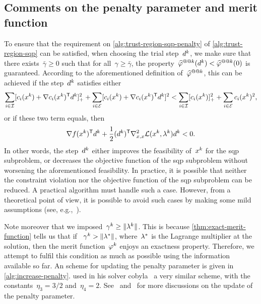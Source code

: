 \subsection{Comments on the penalty parameter and merit function}
\label{subsec:penalty-parameter-merit-function}

To ensure that the requirement on \cref{alg:trust-region-sqp-penalty} of \cref{alg:trust-region-sqp} can be satisfied, when choosing the trial step~$\step[k]$, we make sure that there exists~$\bar{\gamma} \ge 0$ such that for all~$\gamma \ge \bar{\gamma}$, the property~$\meritm[k](\step[k]) < \meritm[k](0)$ is guaranteed.
According to the aforementioned definition of~$\meritm[k]$, this can be achieved if the step~$\step[k]$ satisfies either
\begin{equation*}
    \sum_{i \in \iub} \posp{\con{i}(\iter[k]) + \nabla \con{i}(\iter[k])^{\T} \step[k]}^2 + \sum_{i \in \ieq} [\con{i}(\iter[k]) + \nabla \con{i}(\iter[k])^{\T} \step[k]]^2 < \sum_{i \in \iub} \posp{\con{i}(\iter[k])}^2 + \sum_{i \in \ieq} \con{i}(\iter[k])^2,
\end{equation*}
or if these two term equals, then
\begin{equation*}
    \nabla \obj(\iter[k])^{\T} \step[k] + \frac{1}{2} (\step[k])^{\T} \nabla_{x, x}^2 \lag(\iter[k], \lm[k]) \step[k] < 0.
\end{equation*}
In other words, the step~$\step[k]$ either improves the feasibility of~$\iter[k]$ for the \gls{sqp} subproblem, or decreases the objective function of the \gls{sqp} subproblem without worsening the aforementioned feasibility.
In practice, it is possible that neither the constraint violation nor the objective function of the \gls{sqp} subproblem can be reduced.
A practical algorithm must handle such a case.
However, from a theoretical point of view, it is possible to avoid such cases by making some mild assumptions (see, e.g.,~\cite[Asm.~3.1]{Powell_Yuan_1991}).

Note moreover that we imposed~$\gamma^k \ge \norm{\lm[k]}$.
This is because \cref{thm:exact-merit-function} tells us that if ~$\gamma^k > \norm{\lm[\ast]}$, where~$\lm[\ast]$ is the Lagrange multiplier at the solution, then the merit function~$\merit[k]$ enjoys an exactness property.
Therefore, we attempt to fulfil this condition as much as possible using the information available so far.
An scheme for updating the penalty parameter is given in \cref{alg:increase-penalty}.
\citeauthor{Powell_1994} used in his solver \gls{cobyla}~\cite{Powell_1994} a very similar scheme, with the constants~$\eta_3 = 3/2$ and~$\eta_4 = 2$.
See~\cite[pp.~661--662]{Conn_Gould_Toint_2000} and~\cite[p.~542]{Nocedal_Wright_2006} for more discussions on the update of the penalty parameter.

